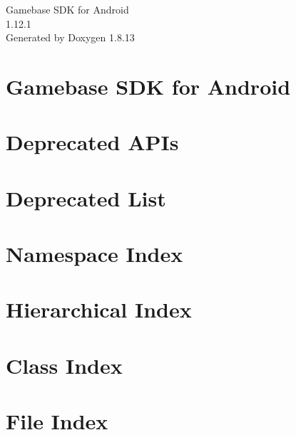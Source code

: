 \documentclass[twoside]{book}
\newcommand{\+}{\discretionary{\mbox{\scriptsize$\hookleftarrow$}}{}{}}
\newcommand{\clearemptydoublepage}{%
  \newpage{\pagestyle{empty}\cleardoublepage}%
}
\begin{document}
\hypersetup{pageanchor=false,
             bookmarksnumbered=true,
             pdfencoding=unicode
            }
\begin{titlepage}
\vspace*{7cm}
\begin{center}%
{\Large Gamebase S\+DK for Android \\[1ex]\large 1.\+12.\+1 }\\
\vspace*{1cm}
{\large Generated by Doxygen 1.8.13}\\
\end{center}
\end{titlepage}
\clearemptydoublepage
{}
\tableofcontents
\clearemptydoublepage
{}
\hypersetup{pageanchor=true}

\chapter{Gamebase S\+DK for Android}
\label{index}\hypertarget{index}{}
\chapter{Deprecated A\+P\+Is}
\label{md__deprecated_a_p_is}

\chapter{Deprecated List}
\label{deprecated}

\chapter{Namespace Index}

\chapter{Hierarchical Index}

\chapter{Class Index}

\chapter{File Index}

\end{document}
